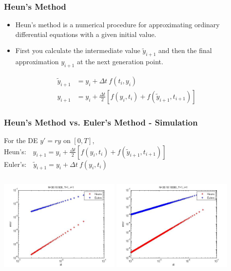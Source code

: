 \begin{frame}
\frametitle{Heun's Method}
\begin{itemize}
\item Heun's method is a numerical procedure for approximating ordinary differential equations with a given initial value.
\item First you calculate the intermediate value $\tilde{y}_{i+1}$ and then the final approximation $y_{i+1}$ at the next generation point.
\end{itemize}

\begin{align*}
	\tilde{y}_{i+1} &= y_i + \Delta t \ f(t_i, y_i) \\
	y_{i+1} &= y_i + \frac{\Delta t}{2} \left[f(y_i,t_i) + f(\tilde{y}_{i+1}, t_{i+1})\right]
\end{align*}
\end{frame}


\begin{frame}
   \frametitle{Heun's Method vs. Euler's Method - Simulation}
For the DE $y'=r y$ on $[0,T]$,\\
\vspace{1em}
		\hspace{1.5em} Heun's:$ \hspace{1em} y_{i+1} = y_i + \frac{\Delta t}{2} \left[f(y_i,t_i) + f(\tilde{y}_{i+1}, t_{i+1})\right]$ \vspace{1em} \\
	\hspace{1.5em} Euler's:$\hspace{1em}\tilde{y}_{i+1} = y_i + \Delta t \ f(y_i, t_i)$ \\
\begin{columns}[t]
    \includegraphics[width=6cm]{img/Heun500}
    \includegraphics[width=6cm]{img/Heun10000}
  \end{columns}

\end{frame}
